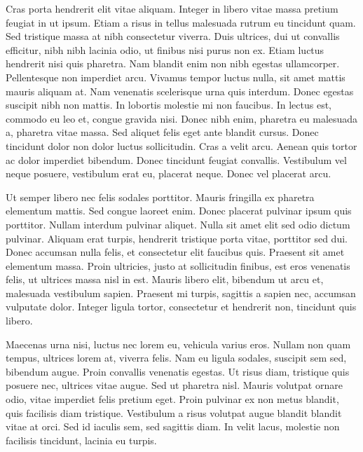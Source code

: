 \documentclass[12pt,onecolumn]{novel}
\begin{document}
Cras porta hendrerit elit vitae aliquam. Integer in libero vitae massa pretium feugiat in ut ipsum. Etiam a risus in tellus malesuada rutrum eu tincidunt quam. Sed tristique massa at nibh consectetur viverra. Duis ultrices, dui ut convallis efficitur, nibh nibh lacinia odio, ut finibus nisi purus non ex. Etiam luctus hendrerit nisi quis pharetra. Nam blandit enim non nibh egestas ullamcorper. Pellentesque non imperdiet arcu. Vivamus tempor luctus nulla, sit amet mattis mauris aliquam at. Nam venenatis scelerisque urna quis interdum. Donec egestas suscipit nibh non mattis. In lobortis molestie mi non faucibus. In lectus est, commodo eu leo et, congue gravida nisi. Donec nibh enim, pharetra eu malesuada a, pharetra vitae massa. Sed aliquet felis eget ante blandit cursus. Donec tincidunt dolor non dolor luctus sollicitudin. Cras a velit arcu. Aenean quis tortor ac dolor imperdiet bibendum. Donec tincidunt feugiat convallis. Vestibulum vel neque posuere, vestibulum erat eu, placerat neque. Donec vel placerat arcu.

Ut semper libero nec felis sodales porttitor. Mauris fringilla ex pharetra elementum mattis. Sed congue laoreet enim. Donec placerat pulvinar ipsum quis porttitor. Nullam interdum pulvinar aliquet. Nulla sit amet elit sed odio dictum pulvinar. Aliquam erat turpis, hendrerit tristique porta vitae, porttitor sed dui. Donec accumsan nulla felis, et consectetur elit faucibus quis. Praesent sit amet elementum massa. Proin ultricies, justo at sollicitudin finibus, est eros venenatis felis, ut ultrices massa nisl in est. Mauris libero elit, bibendum ut arcu et, malesuada vestibulum sapien. Praesent mi turpis, sagittis a sapien nec, accumsan vulputate dolor. Integer ligula tortor, consectetur et hendrerit non, tincidunt quis libero.

Maecenas urna nisi, luctus nec lorem eu, vehicula varius eros. Nullam non quam tempus, ultrices lorem at, viverra felis. Nam eu ligula sodales, suscipit sem sed, bibendum augue. Proin convallis venenatis egestas. Ut risus diam, tristique quis posuere nec, ultrices vitae augue. Sed ut pharetra nisl. Mauris volutpat ornare odio, vitae imperdiet felis pretium eget. Proin pulvinar ex non metus blandit, quis facilisis diam tristique. Vestibulum a risus volutpat augue blandit blandit vitae at orci. Sed id iaculis sem, sed sagittis diam. In velit lacus, molestie non facilisis tincidunt, lacinia eu turpis.
\end{document}

